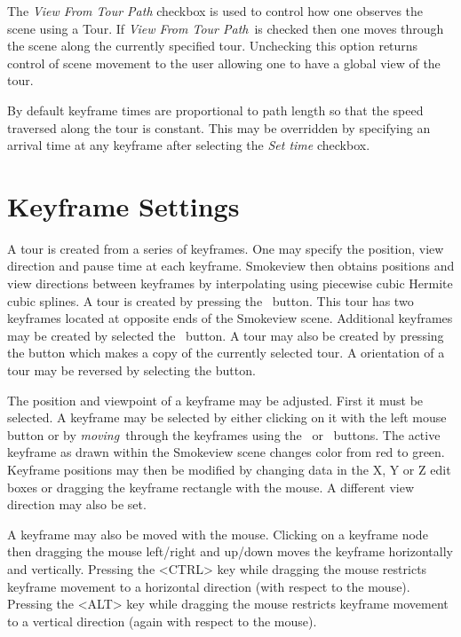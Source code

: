 \documentclass[11pt,twoside]{book}
\newcommand{\frameit}[1]{\fbox{\tt #1}}
\begin{document}
The {\em View From Tour Path} checkbox is used to control how one observes the
scene using a Tour.  If {\em View From Tour Path}\ is checked then one moves through the
scene along the currently specified tour.  Unchecking this option
returns control of scene movement to the user allowing one to have a global view of the tour.

By default keyframe times are  proportional to path length
so that the speed traversed along the tour is constant.
This may be overridden by specifying an arrival time at any keyframe after selecting
the {\em Set time} checkbox.


\section{Keyframe Settings}
A tour is created from a series of keyframes.  One may specify
 the position, view direction and pause time at each keyframe.  Smokeview then
obtains positions and view directions between keyframes by interpolating
using piecewise cubic Hermite cubic splines.
A tour is created by pressing the
\frameit{Add Tour}\ button.  This tour has two keyframes located
at opposite ends of the Smokeview scene.  Additional keyframes may
be created by selected the \frameit{Add}\ button. A tour may also be
created by pressing the \frameit{Copy} button which makes a copy of the
currently selected tour.  A orientation of a tour may be reversed by selecting
the \frameit{Reverse} button.

The position and viewpoint of a keyframe may be adjusted.  First
it must be selected.  A keyframe may be selected by either
clicking on it with the left mouse button or by {\em moving}\ through
the keyframes using the \frameit{Next}\ or \frameit{Previous}\
buttons. The active keyframe as drawn within the Smokeview scene changes color from red to green.
Keyframe positions may then be modified by changing
data in the X, Y or Z edit boxes or dragging the keyframe rectangle with the mouse.  A different view direction
may also be set.

A keyframe may also be moved with the mouse.  Clicking on a
keyframe node then dragging the mouse left/right and up/down
moves the keyframe horizontally and vertically.  Pressing the
<CTRL> key while dragging the mouse
restricts keyframe movement to a horizontal direction (with respect to the mouse).
Pressing the <ALT> key while dragging the mouse
restricts keyframe movement to a vertical direction (again with respect to the mouse).
\end{document}
